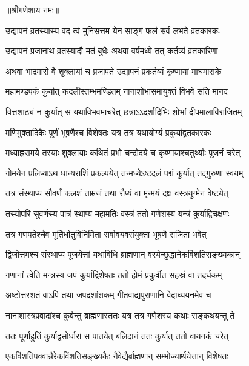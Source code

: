 \centerline{॥श्रीगणेशाय नमः॥}


\twolineshloka
{उद्यापनं व्रतस्यास्य वद त्वं मुनिसत्तम}
{येन साङ्गं फलं सर्वं लभते व्रतकारकः} %


\twolineshloka
{उद्यापनं प्रजानाथ व्रतस्यादौ मतं बुधैः}
{अथवा वर्षमध्ये तत् कर्तव्यं व्रतकारिणा} %

\twolineshloka
{अथवा भाद्रमासे वै शुक्लायां च प्रजापते}
{उद्यापनं प्रकर्तव्यं कृष्णायां माघमासके} %

\twolineshloka
{महामण्डपकं कुर्यात् कदलीस्तम्भमण्डितम्}
{नानाशोभासमायुक्तं विभवे सति मानद} %

\twolineshloka
{वित्तशाठ्यं न कुर्यात् स यथाविभवमाचरेत्}
{छत्राऽऽदर्शादिभिः शोभां दीपमालाविराजितम्} %

\twolineshloka
{मणिमुक्तादिकैः पूर्णं भूषणैश्च विशेषतः}
{यत्र तत्र यथायोग्यं प्रकुर्याद्व्रतकारकः} %

\twolineshloka
{मध्याह्नसमये तस्याः शुक्लायाः कथितं प्रभो}
{चन्द्रोदये च कृष्णायाश्चतुर्थ्याः पूजनं चरेत्} %

\twolineshloka
{गोमयेन प्रलिप्याऽथ धान्यराशिं प्रकल्पयेत्}
{तन्मध्येऽष्टदलं पद्मं कुर्यात् तद्गुरुणा स्वयम्} %

\twolineshloka
{तत्र संस्थाप्य सौवर्णं कलशं ताम्रजं तथा}
{रौप्यं वा मृन्मयं दक्ष वस्त्रयुग्मेन वेष्टयेत्} %

\twolineshloka
{तस्योपरि सुवर्णस्य पात्रं स्थाप्य महामतिः}
{वस्त्रं ततो गणेशस्य यन्त्रं कुर्याद्विचक्षणः} %

\twolineshloka
{तत्र गणपतेश्चैव मूर्तिर्धातुविनिर्मिता}
{सर्वावयवसंयुक्ता भूषणै राजिता भवेत्} %

\twolineshloka
{द्विजोत्तमश्च संस्थाप्य पूजयेत्तां यथाविधि}
{ब्राह्मणान् वरयेच्छुद्धानेकविंशतिसङ्ख्यकान्} %

\twolineshloka
{गणानां त्वेति मन्त्रस्य जपं कुर्याद्विशेषतः}
{ततो होमं प्रकुर्वीत सहस्रं वा तदर्धकम्} %

\twolineshloka
{अष्टोत्तरशतं वाऽपि तथा जपदशांशकम्}
{गीतवाद्यपुराणानि वेदाध्ययनमेव च} %

\twolineshloka
{नानाशास्त्रप्रवादांश्च कुर्वन्तु ब्राह्मणास्ततः}
{यत्र तत्र गणेशस्य कथाः सङ्कथयन्तु ते} %

\twolineshloka
{ततः पूर्णाहुतिं कुर्याद्वसोर्धारां स पातयेत्}
{बलिदानं ततः कुर्यात् ततो वायनकं चरेत्} %

\twolineshloka
{एकविंशतिपक्वान्नैरेकविंशतिसङ्ख्यकैः}
{नैवेद्यैर्ब्राह्मणान् सम्भोज्यार्थयेत्तान् विशेषतः} %

